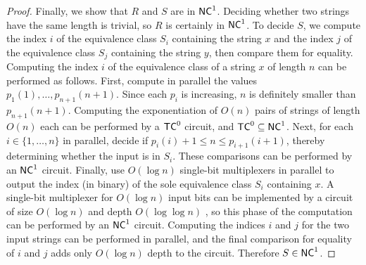 \begin{proof}
  Finally, we show that $R$ and $S$ are in ${\mathsf{NC}}^1$.
  Deciding whether two strings have the same length is trivial, so $R$ is certainly in ${\mathsf{NC}}^1$.
  To decide $S$, we compute the index $i$ of the equivalence class $S_i$ containing the string $x$ and the index $j$ of the equivalence class $S_j$ containing the string $y$, then compare them for equality.
  Computing the index $i$ of the equivalence class of a string $x$ of length $n$ can be performed as follows.
  First, compute in parallel the values $p_1(1), \dotsc, p_{n + 1}(n + 1)$.
  Since each $p_i$ is increasing, $n$ is definitely smaller than $p_{n + 1}(n + 1)$.
  Computing the exponentiation of $O(n)$ pairs of strings of length $O(n)$ each can be performed by a ${\mathsf{TC}}^0$ circuit, and ${\mathsf{TC}}^0 \subseteq {\ensuremath{\mathsf{NC}}}^1$.
  Next, for each $i \in \{1, \dotsc, n\}$ in parallel, decide if $p_i(i) + 1 \leq n \leq p_{i + 1}(i + 1)$, thereby determining whether the input is in $S_i$.
  These comparisons can be performed by an ${\mathsf{NC}}^1$ circuit.
  Finally, use $O(\log n)$ single-bit multiplexers in parallel to output the index (in binary) of the sole equivalence class $S_i$ containing $x$.
  A single-bit multiplexer for $O(\log n)$ input bits can be implemented by a circuit of size $O(\log n)$ and depth $O(\log \log n)$ \autocite[Lemma~2.5.5]{savage98}, so this phase of the computation can be performed by an ${\mathsf{NC}}^1$ circuit.
  Computing the indices $i$ and $j$ for the two input strings can be performed in parallel, and the final comparison for equality of $i$ and $j$ adds only $O(\log n)$ depth to the circuit.
  Therefore $S \in {\ensuremath{\mathsf{NC}}}^1$.
\end{proof}
